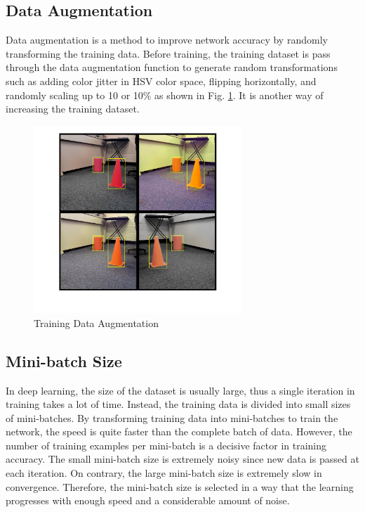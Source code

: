 \subsection{Data Augmentation}
Data augmentation is a method to improve network accuracy by randomly transforming the training data. Before training, the training dataset is pass through the data augmentation function to generate random transformations such as adding color jitter in HSV color space, flipping horizontally, and randomly scaling up to 10 or 10$\%$ as shown in Fig. \ref{augmentation}. It is another way of increasing the training dataset.

\begin{figure}
    \centering
    \includegraphics[width=0.7\textwidth]{Images/augmentation.png}
    \caption{Training Data Augmentation}
    \label{augmentation}
\end{figure}

\subsection{Mini-batch Size}
In deep learning, the size of the dataset is usually large, thus a single iteration in training takes a lot of time. Instead, the training data is divided into small sizes of mini-batches. By transforming training data into mini-batches to train the network, the speed is quite faster than the complete batch of data. However, the number of training examples per mini-batch is a decisive factor in training accuracy. The small mini-batch size is extremely noisy since new data is passed at each iteration. On contrary, the large mini-batch size is extremely slow in convergence. Therefore, the mini-batch size is selected in a way that the learning progresses with enough speed and a considerable amount of noise.  

